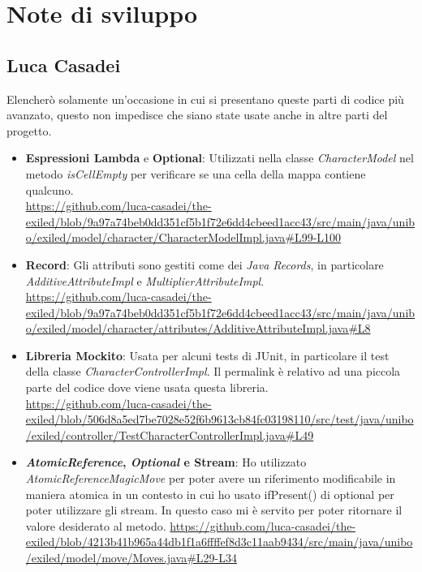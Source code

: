 \documentclass[a4paper,12pt]{report}
\begin{document}
\section{Note di sviluppo}

\subsection{Luca Casadei}
Elencherò solamente un'occasione in cui si presentano queste parti di codice più avanzato, questo non impedisce che siano state usate anche in altre parti del progetto.
\begin{itemize}
	\item \textbf{Espressioni Lambda} e \textbf{Optional}: Utilizzati nella classe \textit{CharacterModel} nel metodo \textit{isCellEmpty} per verificare se una cella della mappa contiene qualcuno.\\
	\url{https://github.com/luca-casadei/the-exiled/blob/9a97a74beb0dd351cf5b1f72e6dd4cbeed1acc43/src/main/java/unibo/exiled/model/character/CharacterModelImpl.java#L99-L100}
	\item \textbf{Record}: Gli attributi sono gestiti come dei \textit{Java Records}, in particolare \textit{AdditiveAttributeImpl} e \textit{MultiplierAttributeImpl}.\\
	\url{https://github.com/luca-casadei/the-exiled/blob/9a97a74beb0dd351cf5b1f72e6dd4cbeed1acc43/src/main/java/unibo/exiled/model/character/attributes/AdditiveAttributeImpl.java#L8}
	\item \textbf{Libreria Mockito}: Usata per alcuni tests di JUnit, in particolare il test della classe \textit{CharacterControllerImpl}. Il permalink è relativo ad una piccola parte del codice dove viene usata questa libreria.\\
	\url{https://github.com/luca-casadei/the-exiled/blob/506d8a5ed7be7028e52f6b9613cb84fc03198110/src/test/java/unibo/exiled/controller/TestCharacterControllerImpl.java#L49}
	\item \textbf{\textit{AtomicReference}, \textit{Optional} e Stream}: Ho utilizzato \textit{AtomicReference\textlangle MagicMove\textrangle} per poter avere un riferimento modificabile in maniera atomica in un contesto in cui ho usato ifPresent() di optional per poter utilizzare gli stream. In questo caso mi è servito per poter ritornare il valore desiderato al metodo.
	\url{https://github.com/luca-casadei/the-exiled/blob/4213b41b965a44db1f1a6ffffef8d3c11aab9434/src/main/java/unibo/exiled/model/move/Moves.java#L29-L34}
\end{itemize}
\end{document}
